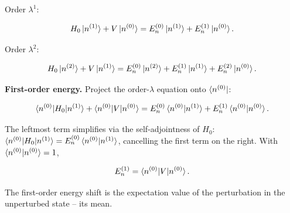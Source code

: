 Order $\lambda^{1}$:
\begin{linenomath}
\begin{equation*}
H_{0}\ket{n^{(1)}} + V\ket{n^{(0)}} = E_{n}^{(0)}\ket{n^{(1)}} + E_{n}^{(1)}\ket{n^{(0)}}.
\end{equation*}
\end{linenomath}

Order $\lambda^{2}$:
\begin{linenomath}
\begin{equation*}
H_{0}\ket{n^{(2)}} + V\ket{n^{(1)}} = E_{n}^{(0)}\ket{n^{(2)}} + E_{n}^{(1)}\ket{n^{(1)}} + E_{n}^{(2)}\ket{n^{(0)}}.
\end{equation*}
\end{linenomath}

\medskip\noindent\textbf{First-order energy.}
Project the order-$\lambda$ equation onto $\bra{n^{(0)}}$:
\begin{linenomath}
\begin{equation*}
\braket{n^{(0)}|H_{0}|n^{(1)}} + \braket{n^{(0)}|V|n^{(0)}} = E_{n}^{(0)}\braket{n^{(0)}|n^{(1)}} + E_{n}^{(1)}\braket{n^{(0)}|n^{(0)}}.
\end{equation*}
\end{linenomath}
The leftmost term simplifies via the self-adjointness of $H_{0}$: $\braket{n^{(0)}|H_{0}|n^{(1)}} = E_{n}^{(0)}\braket{n^{(0)}|n^{(1)}}$, cancelling the first term on the right. With $\braket{n^{(0)}|n^{(0)}}=1$,
\begin{linenomath}
\begin{equation}
E_{n}^{(1)} = \braket{n^{(0)}|V|n^{(0)}}.
\label{eq:rs-first-order-energy}
\end{equation}
\end{linenomath}
The first-order energy shift is the expectation value of the perturbation in the unperturbed state -- its mean.

